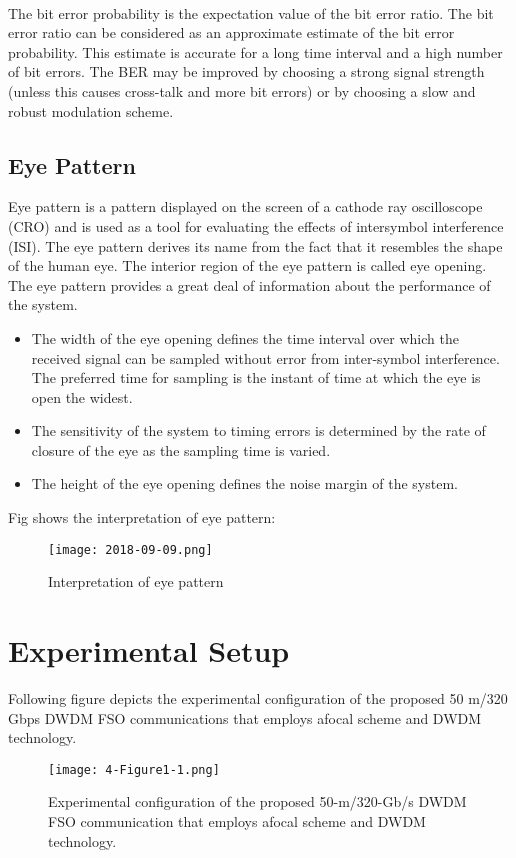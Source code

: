 \documentclass[hidelinks, 12pt]{report}
\begin{document}
\\The bit error probability is the expectation value of the bit error ratio. The bit error ratio can be considered as an approximate estimate of the bit error probability. This estimate is accurate for a long time interval and a high number of bit errors.
The BER may be improved by choosing a strong signal strength (unless this causes cross-talk and more bit errors) or by choosing a slow and robust modulation scheme.
\section{Eye Pattern}
\justify
Eye pattern is a pattern displayed on the screen of a cathode ray oscilloscope (CRO) and is used as a tool for evaluating 
the effects of intersymbol interference (ISI).
The eye pattern derives its name from the fact 
that it resembles the shape of the human eye.
The interior region of the eye pattern is called 
eye opening. The eye pattern provides a great deal of information about the performance of the system.
\begin{itemize}
\item The width of the eye opening defines the time interval over which the received signal can be sampled without error from inter-symbol interference. The preferred time for sampling is the instant of time at which the eye is open the 
widest.
\item
The sensitivity of the system to timing errors is determined by the rate of closure of the eye as the sampling time is varied.
\item
The height of the eye opening defines the noise 
margin of the system.
\end{itemize}
Fig shows the interpretation of eye pattern:
\begin{figure}[H]
\centering
\texttt{[image: 2018-09-09.png]}
\caption[Interpretation of eye pattern]{Interpretation of eye pattern}
\label{Interpretation of eye pattern}
\end{figure}

\chapter{Experimental Setup}
Following figure depicts the experimental configuration of the proposed 50 m/320 Gbps DWDM FSO communications
that employs afocal scheme and DWDM technology.
\begin{figure}[H]
\centering
\texttt{[image: 4-Figure1-1.png]}
\caption[Experimental configuration of the proposed 50-m/320-Gb/s DWDM FSO communication that
employs afocal scheme and DWDM technology.]{Experimental configuration of the proposed 50-m/320-Gb/s DWDM FSO communication that
employs afocal scheme and DWDM technology.}
\label{Experimental configuration of the proposed 50-m/320-Gb/s DWDM FSO communication that
employs afocal scheme and DWDM technology.}
\end{figure}
\\
\end{document}
